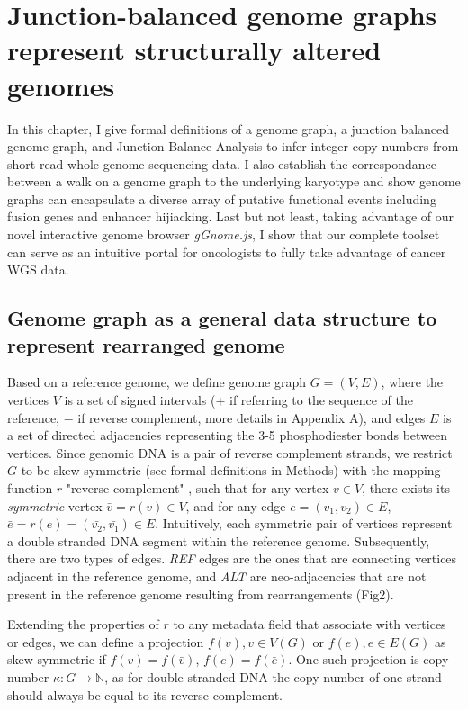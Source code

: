 \documentclass[phd,tocprelim]{cornell}
\begin{document}
\chapter{Junction-balanced genome graphs represent structurally altered genomes}
In this chapter, I give formal definitions of a genome graph, a junction balanced genome graph, and Junction Balance Analysis to infer integer copy numbers from short-read whole genome sequencing data. I also establish the correspondance between a walk on a genome graph to the underlying karyotype and show genome graphs can encapsulate a diverse array of putative functional events including fusion genes and enhancer hijiacking. Last but not least, taking advantage of our novel interactive genome browser \textit{gGnome.js}, I show that our complete toolset can serve as an intuitive portal for oncologists to fully take advantage of cancer WGS data.

\section{Genome graph as a general data structure to represent rearranged genome}
Based on a reference genome, we define genome graph $G = (V, E)$, where the vertices $V$ is a set of signed intervals ($+$ if referring to the sequence of the reference, $-$ if reverse complement, more details in Appendix A), and edges $E$ is a set of directed adjacencies representing the 3-5 phosphodiester bonds between vertices. Since genomic DNA is a pair of reverse complement strands, we restrict $G$ to be skew-symmetric (see formal definitions in Methods) with the mapping function $r$ "reverse complement" \cite{Goldberg1996-qm}, such that for any vertex $v \in V$, there exists its \textit{symmetric} vertex $\bar{v} = r(v) \in V$, and for any edge $e = (v_1, v_2) \in E$, $\bar{e} = r(e) = (\bar{v_2}, \bar{v_1}) \in E$. Intuitively, each symmetric pair of vertices represent a double stranded DNA segment within the reference genome. Subsequently, there are two types of edges. \textit{REF} edges are the ones that are connecting vertices adjacent in the reference genome, and \textit{ALT} are neo-adjacencies that are not present in the reference genome resulting from rearrangements (Fig2).

Extending the properties of $r$ to any metadata field that associate with vertices or edges, we can define a projection $f(v), v \in V(G)$ or $f(e), e \in E(G)$ as skew-symmetric if $f(v) = f(\bar{v})$, $f(e)=f(\bar{e})$. One such projection is copy number $\kappa : G \rightarrow \mathbb{N}$, as for double stranded DNA the copy number of one strand should always be equal to its reverse complement.
\end{document}
